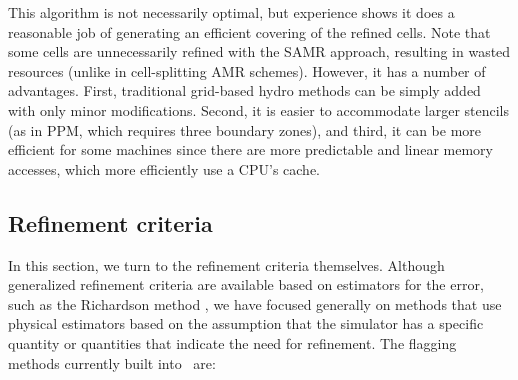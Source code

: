 This algorithm is not necessarily optimal, but experience shows it
does a reasonable job of generating an efficient covering of the
refined cells.  Note that some cells are unnecessarily refined with
the SAMR approach, resulting in wasted resources (unlike in
cell-splitting AMR schemes).  However, it has a number of advantages.
First, traditional grid-based hydro methods can be simply added with
only minor modifications.  Second, it is easier to accommodate larger
stencils (as in PPM, which requires three boundary zones), and third,
it can be more efficient for some machines since there are more
predictable and linear memory accesses, which more efficiently use a
CPU's cache.

\subsection{Refinement criteria}
\label{sec:refinement_criteria}

In this section, we turn to the refinement criteria themselves.
Although generalized refinement criteria are available based on
estimators for the error, such as the Richardson method
\citep{AtkinsonHan2004}, we have focused generally on methods that use
physical estimators based on the assumption that the simulator has a
specific quantity or quantities that indicate the need for refinement.
The flagging methods currently built into \enzo\ are:

